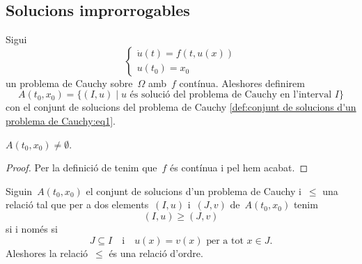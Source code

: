 \documentclass[../../main.tex]{subfiles}
\begin{document}
    \subsection{Solucions improrrogables}
    \begin{definition}
        \label{def:conjunt de solucions d'un problema de Cauchy}
        Sigui
        \begin{equation}
            \label{def:conjunt de solucions d'un problema de Cauchy:eq1}
            \begin{cases}
                \displaystyle \dot{u}(t)=f(t,u(x)) \\
                \displaystyle u(t_{0})=x_{0}
            \end{cases}
        \end{equation}
        un problema de Cauchy sobre~\(\Omega\) amb~\(f\) contínua.
        Aleshores definirem
        \[
            A(t_{0},x_{0})=\{(I,u)\mid u\text{ és solució del problema de Cauchy en l'interval }I\}
        \]
        con el conjunt de solucions del problema de Cauchy \eqref{def:conjunt de solucions d'un problema de Cauchy:eq1}.
    \end{definition}
    \begin{observation}
        \label{obs:el conjunt de solucions d'un problema de Cauchy amb f contínua és no buit}
        \(A(t_{0},x_{0})\neq\emptyset\).
    \end{observation}
    \begin{proof}
        Per la definició de  tenim que~\(f\) és contínua i pel  hem acabat.
    \end{proof}
    \begin{proposition}
        \label{prop:la prolongació és una relació d'ordre}
        Siguin~\(A(t_{0},x_{0})\) el conjunt de solucions d'un problema de Cauchy i~\(\leq\) una relació tal que per a dos elements~\((I,u)\) i~\((J,v)\) de~\(A(t_{0},x_{0})\) tenim
        \[
            (I,u)\geq(J,v)
        \]
        si i només si
        \[
            J\subseteq I\quad\text{i}\quad u(x)=v(x)\text{ per a tot }x\in J.
        \]
        Aleshores la relació~\(\leq\) és una relació d'ordre.
    \end{proposition}
\end{document}
